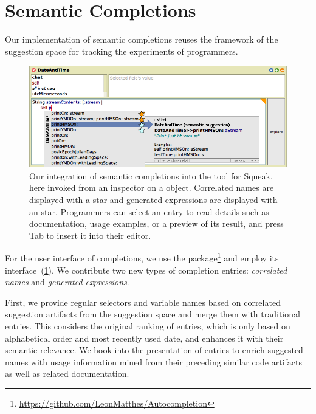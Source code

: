 
\section{Semantic Completions}
\label{sec:implementation/completions}

Our implementation of semantic completions reuses the framework of the suggestion space for tracking the experiments of programmers.

\begin{figure}
	\centering
	\includegraphics[width=\textwidth]{02_completions/screenshot.png} %
	\caption[Integration of semantic completions into the  tool for Squeak.]{
		Our integration of semantic completions into the  tool for Squeak, here invoked from an inspector on a  object.
		Correlated names are displayed with a \bold{\textcolor[HTML]{598db3}{blue}} star and generated expressions are displayed with an \bold{\textcolor{orange!80!black}{orange}} star.
		Programmers can select an entry to read details such as documentation, usage examples, or a preview of its result, and press Tab to insert it into their editor.
	}
	\label{fig:implementation/completions}
\end{figure}

For the user interface of completions, we use the  package\footnote{\url{https://github.com/LeonMatthes/Autocompletion}} and employ its  interface~(\cref{fig:implementation/completions}).
We contribute two new types of completion entries: \emph{correlated names} and \emph{generated expressions}.

First, we provide regular selectors and variable names based on correlated suggestion artifacts from the suggestion space and merge them with traditional  entries.
This considers the original ranking of entries, which is only based on alphabetical order and most recently used date, and enhances it with their semantic relevance.
We hook into the presentation of entries to enrich suggested names with usage information mined from their preceding similar code artifacts as well as related documentation.

